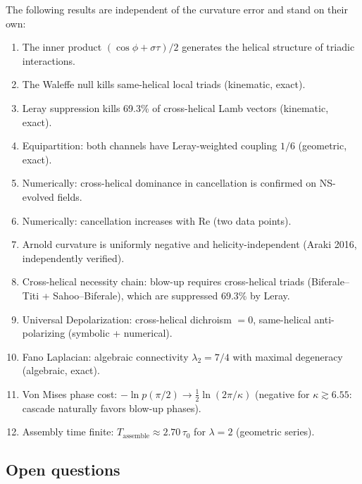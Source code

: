 \documentclass[11pt]{article}
\theoremstyle{definition}
\theoremstyle{remark}
\begin{document}
The following results are independent of the curvature error and
stand on their own:

\begin{enumerate}
  \item The inner product $(\cos\phi + \sigma\tau)/2$ generates the
    helical structure of triadic interactions.
  \item The Waleffe null kills same-helical local triads
    (kinematic, exact).
  \item Leray suppression kills 69.3\% of cross-helical Lamb vectors
    (kinematic, exact).
  \item Equipartition: both channels have Leray-weighted coupling
    $1/6$ (geometric, exact).
  \item Numerically: cross-helical dominance in cancellation is
    confirmed on NS-evolved fields.
  \item Numerically: cancellation increases with Re (two data points).
  \item Arnold curvature is uniformly negative and
    helicity-independent (Araki 2016, independently verified).
  \item Cross-helical necessity chain: blow-up requires cross-helical
    triads (Biferale--Titi + Sahoo--Biferale), which are suppressed
    69.3\% by Leray.
  \item Universal Depolarization: cross-helical dichroism $= 0$,
    same-helical anti-polarizing (symbolic + numerical).
  \item Fano Laplacian: algebraic connectivity $\lambda_2 = 7/4$
    with maximal degeneracy (algebraic, exact).
  \item Von Mises phase cost: $-\ln p(\pi/2) \to
    \tfrac{1}{2}\ln(2\pi/\kappa)$ (negative for $\kappa \gtrsim 6.55$:
    cascade naturally favors blow-up phases).
  \item Assembly time finite: $T_{\mathrm{assemble}} \approx
    2.70\,\tau_0$ for $\lambda = 2$ (geometric series).
\end{enumerate}

\subsection{Open questions}
\end{document}
